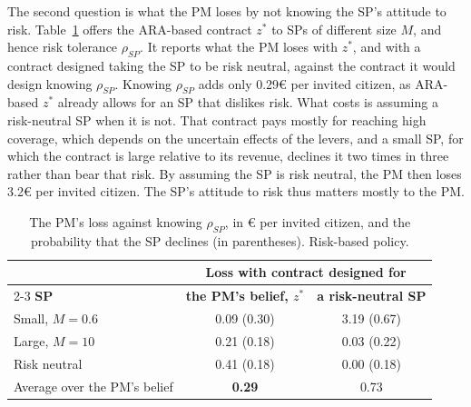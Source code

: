 \documentclass[12pt]{article}
\begin{document}
The second question is what the PM loses by not knowing the SP's attitude to risk. Table~\ref{tab:sp_attitude} offers the ARA-based contract $z^*$ to SPs of different size $M$, and hence risk tolerance $\rho_{SP}$. It reports what the PM loses with $z^*$, and with a contract designed taking the SP to be risk neutral, against the contract it would design knowing $\rho_{SP}$. Knowing $\rho_{SP}$ adds only 0.29€ per invited citizen, as ARA-based $z^*$ already allows for an SP that dislikes risk. What costs is assuming a risk-neutral SP when it is not. That contract pays mostly for reaching high coverage, which depends on the uncertain effects of the levers, and a small SP, for which the contract is large relative to its revenue, declines it two times in three rather than bear that risk. By assuming the SP is risk neutral, the PM then loses 3.2€ per invited citizen. The SP's attitude to risk thus matters mostly to the PM. 

\begin{table}[h!]
\centering
\footnotesize
\caption{The PM's loss against knowing $\rho_{SP}$, in € per invited citizen, and the probability that the SP declines (in parentheses). Risk-based policy.}
\label{tab:sp_attitude}
\begin{tabular}{l c c}
\toprule
 & \multicolumn{2}{c}{\textbf{Loss with contract designed for}} \\
\cmidrule(lr){2-3}
\textbf{SP} & \textbf{the PM's belief, $z^*$} & \textbf{a risk-neutral SP} \\
\midrule
Small, $M = 0.6$ & 0.09 (0.30) & 3.19 (0.67) \\
Large, $M = 10$ & 0.21 (0.18) & 0.03 (0.22) \\
Risk neutral & 0.41 (0.18) & 0.00 (0.18) \\
\midrule
Average over the PM's belief & \textbf{0.29} & 0.73 \\
\bottomrule
\end{tabular}
\end{table}
\end{document}
